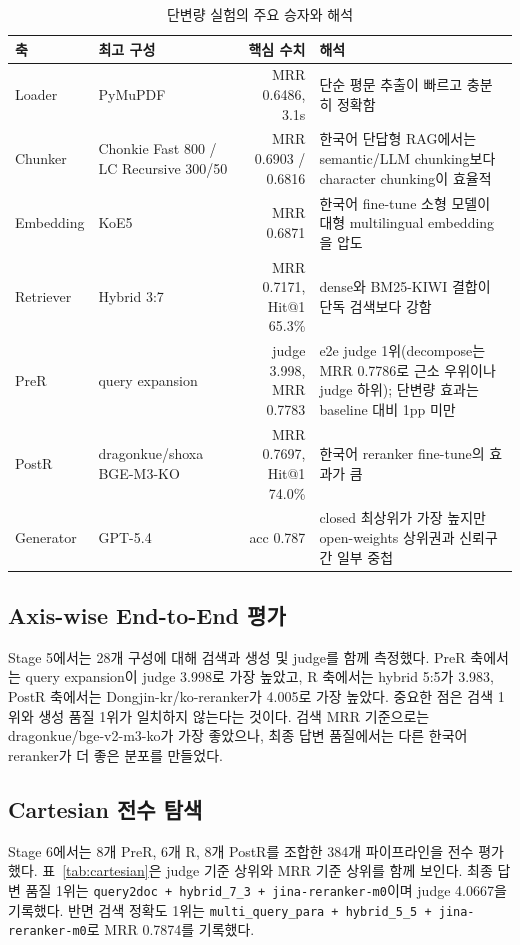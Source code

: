 \documentclass[10pt,a4paper,twocolumn]{article}
\newcommand{\code}[1]{\texttt{#1}}
\begin{document}
\begin{table}[t]
\centering
\caption{단변량 실험의 주요 승자와 해석}
\label{tab:univariate}
\small
\begin{tabularx}{\textwidth}{l l r Y}
\toprule
축 & 최고 구성 & 핵심 수치 & 해석 \\
\midrule
Loader & PyMuPDF & MRR 0.6486, 3.1s & 단순 평문 추출이 빠르고 충분히 정확함 \\
Chunker & Chonkie Fast 800 / LC Recursive 300/50 & MRR 0.6903 / 0.6816 & 한국어 단답형 RAG에서는 semantic/LLM chunking보다 character chunking이 효율적 \\
Embedding & KoE5 & MRR 0.6871 & 한국어 fine-tune 소형 모델이 대형 multilingual embedding을 압도 \\
Retriever & Hybrid 3:7 & MRR 0.7171, Hit@1 65.3\% & dense와 BM25-KIWI 결합이 단독 검색보다 강함 \\
PreR & query expansion & judge 3.998, MRR 0.7783 & e2e judge 1위(decompose는 MRR 0.7786로 근소 우위이나 judge 하위); 단변량 효과는 baseline 대비 1pp 미만 \\
PostR & dragonkue/shoxa BGE-M3-KO & MRR 0.7697, Hit@1 74.0\% & 한국어 reranker fine-tune의 효과가 큼 \\
Generator & GPT-5.4 & acc 0.787 & closed 최상위가 가장 높지만 open-weights 상위권과 신뢰구간 일부 중첩 \\
\bottomrule
\end{tabularx}
\end{table}

\subsection{Axis-wise End-to-End 평가}
Stage 5에서는 28개 구성에 대해 검색과 생성 및 judge를 함께 측정했다. PreR 축에서는 query expansion이 judge 3.998로 가장 높았고, R 축에서는 hybrid 5:5가 3.983, PostR 축에서는 Dongjin-kr/ko-reranker가 4.005로 가장 높았다. 중요한 점은 검색 1위와 생성 품질 1위가 일치하지 않는다는 것이다. 검색 MRR 기준으로는 dragonkue/bge-v2-m3-ko가 가장 좋았으나, 최종 답변 품질에서는 다른 한국어 reranker가 더 좋은 분포를 만들었다.

\subsection{Cartesian 전수 탐색}
Stage 6에서는 8개 PreR, 6개 R, 8개 PostR를 조합한 384개 파이프라인을 전수 평가했다. 표~\ref{tab:cartesian}은 judge 기준 상위와 MRR 기준 상위를 함께 보인다. 최종 답변 품질 1위는 \code{query2doc + hybrid\_7\_3 + jina-reranker-m0}이며 judge 4.0667을 기록했다. 반면 검색 정확도 1위는 \code{multi\_query\_para + hybrid\_5\_5 + jina-reranker-m0}로 MRR 0.7874를 기록했다.
\end{document}
